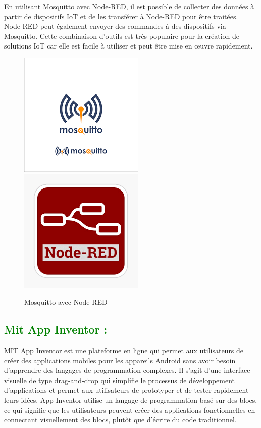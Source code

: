 \begin{flushleft}
	En utilisant Mosquitto avec Node-RED, il est possible de collecter des données à partir de dispositifs IoT et de les transférer à Node-RED pour être traitées. Node-RED peut également envoyer des commandes à des dispositifs via Mosquitto. Cette combinaison d'outils est très populaire pour la création de solutions IoT car elle est facile à utiliser et peut être mise en œuvre rapidement.
	\begin{figure}[h]
		\centering
		\includegraphics{chapitres/images/mosquitto.png}
		\includegraphics{chapitres/images/nodeRed.png}
		\caption{Mosquitto avec Node-RED}
		\label{fig:labelname}
	\end{figure}
	\newpage
	\subsection{\textcolor{green}{Mit App Inventor :}}
	MIT App Inventor est une plateforme en ligne qui permet aux utilisateurs de créer des applications mobiles pour les appareils Android sans avoir besoin d'apprendre des langages de programmation complexes. Il s'agit d'une interface visuelle de type drag-and-drop qui simplifie le processus de développement d'applications et permet aux utilisateurs de prototyper et de tester rapidement leurs idées. App Inventor utilise un langage de programmation basé sur des blocs, ce qui signifie que les utilisateurs peuvent créer des applications fonctionnelles en connectant visuellement des blocs, plutôt que d'écrire du code traditionnel.
	

\end{flushleft}
